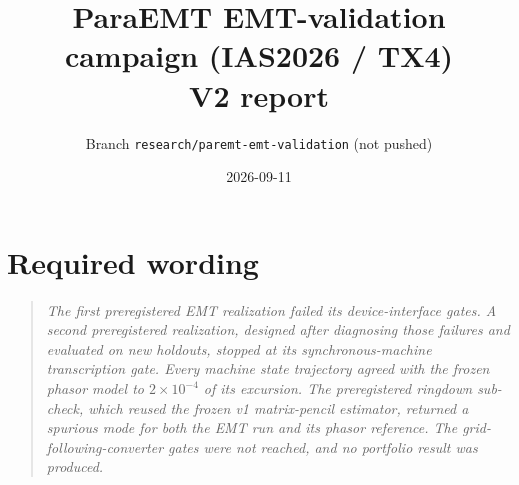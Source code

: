 \documentclass[10pt,a4paper]{article}
\title{\textbf{ParaEMT EMT-validation campaign (IAS2026 / TX4)}\\[3pt]\large V2 report}
\author{Branch \texttt{research/paremt-emt-validation} (not pushed)}
\date{2026-09-11}
\begin{document}
\maketitle

\begin{center}
\end{center}

\tableofcontents

\section{Required wording}

\begin{quote}\itshape
The first preregistered EMT realization failed its device-interface gates. A
second preregistered realization, designed after diagnosing those failures and
evaluated on new holdouts, stopped at its synchronous-machine transcription
gate. Every machine state trajectory agreed with the frozen phasor model to
$2\times10^{-4}$ of its excursion. The preregistered ringdown sub-check, which
reused the frozen v1 matrix-pencil estimator, returned a spurious mode for both
the EMT run and its phasor reference. The grid-following-converter gates were
not reached, and no portfolio result was produced.
\end{quote}
\end{document}
